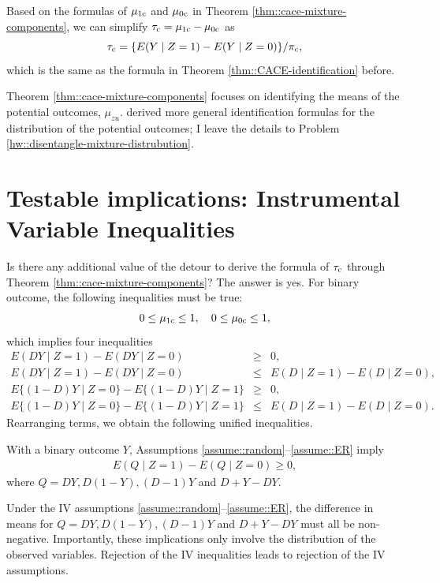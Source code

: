 Based on the formulas of $\mu_{1\textup{c}} $ and $\mu_{0\textup{c}} $ in Theorem \ref{thm::cace-mixture-components}, we can simplify $\tau_{\textup{c}} = \mu_{1\textup{c}}  - \mu_{0\textup{c}}  $ as 
$$
\tau_{\textup{c}} =  \{  E(Y\mid Z=1) - E(Y\mid Z=0) \}/\pi_{\textup{c}} ,
$$
which is the same as the formula in Theorem \ref{thm::CACE-identification} before. 

Theorem \ref{thm::cace-mixture-components} focuses on identifying the means of the potential outcomes, $\mu_{zu} $. \citet{imbens1997estimating} derived more general identification formulas for the distribution of the potential outcomes; I leave the details to Problem \ref{hw::disentangle-mixture-distrubution}.



\section{Testable implications: Instrumental Variable Inequalities}


Is there any additional value of the detour to derive the formula of $\tau_{\textup{c}}$ through Theorem \ref{thm::cace-mixture-components}? The answer is yes. For binary outcome, the following inequalities must be true: 
$$
0\leq \mu_{1\textup{c}} \leq 1, \quad 
0\leq \mu_{0\textup{c}} \leq 1, 
$$
which implies four inequalities
\begin{eqnarray*}
E(DY\mid Z=1 )  -  E(DY\mid Z=0) &\geq & 0 ,\\
E(DY\mid Z=1 )  -  E(DY\mid Z=0) &\leq  & E(D\mid Z=1) - E(D\mid Z=0)  ,\\ 
E\{ (1-D)Y\mid Z=0 \}  -  E\{(1-D)Y\mid Z=1 \}   &\geq & 0,\\
E\{ (1-D)Y\mid Z=0 \}  -  E\{(1-D)Y\mid Z=1 \}  &\leq & E(D\mid Z=1) - E(D\mid Z=0) . 
\end{eqnarray*}
Rearranging terms, we obtain the following unified inequalities.


\begin{theorem}\label{thm::iv-inequality}
With a binary outcome $Y$, Assumptions \ref{assume::random}--\ref{assume::ER} imply 
\begin{eqnarray}\label{eq::iv-inequalities}
E(Q\mid Z=1) - E(Q\mid Z=0) \geq 0,  
\end{eqnarray}
where $Q = DY, D(1-Y), (D - 1)Y$ and $D+Y-DY$.
\end{theorem}


Under the IV assumptions \ref{assume::random}--\ref{assume::ER}, the difference in means for $Q = DY, D(1-Y), (D - 1)Y$ and $D+Y-DY$ must all be non-negative. Importantly, these implications only involve the distribution of the observed variables. Rejection of the IV inequalities leads to rejection of the  IV assumptions. 



